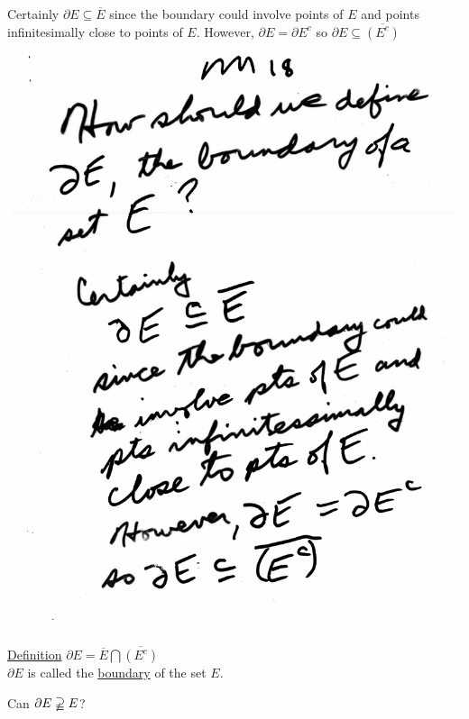 \documentclass[10pt,a4paper]{article}
\begin{document}
{{\begin{flushleft}
Certainly $\partial E \subseteq \overline{E}$ since the boundary could involve points of $E$ and points infinitesimally close to points of $E$. However, $\partial E = \partial E^c$ so $\partial E \subseteq \overline{(E^c)}$
\includegraphics[scale=.5]{Pages/MS_18}

\newpage
\underline{Definition} $\partial E = \overline{E} \bigcap \overline{(E^c)}$\\ $\partial E$ is called the \underline{boundary} of the set $E$. 

Can $\partial E \varsupsetneqq E$?


\end{flushleft}}}
\end{document}
